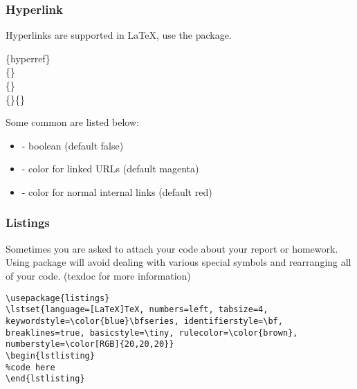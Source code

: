 \begin{frame}
	\frametitle{Hyperlink}
	Hyperlinks are supported in \LaTeX, use the  package.
	\begin{command}
		\{hyperref\}\\
		\{\}\\
		\{\}\\
		\{\}\{\}
	\end{command}
	Some common  are listed below: 
	\begin{itemize}
		\item {} - boolean (default false)
		\item {} - color for linked URLs (default magenta)
		\item {} - color for normal internal links (default red)
	\end{itemize}
\end{frame}

\begin{frame}[fragile]
	\frametitle{Listings}
	Sometimes you are asked to attach your code about your report or homework. Using  package will avoid dealing with various special symbols and rearranging all of your code. (\alert{texdoc}  for more information)
	\begin{example}
		\begin{verbatim}
\usepackage{listings}
\lstset{language=[LaTeX]TeX, numbers=left, tabsize=4, keywordstyle=\color{blue}\bfseries, identifierstyle=\bf, breaklines=true, basicstyle=\tiny, rulecolor=\color{brown}, numberstyle=\color[RGB]{20,20,20}}
\begin{lstlisting}
%code here
\end{lstlisting}
		\end{verbatim}
	\end{example} 
\end{frame}	

